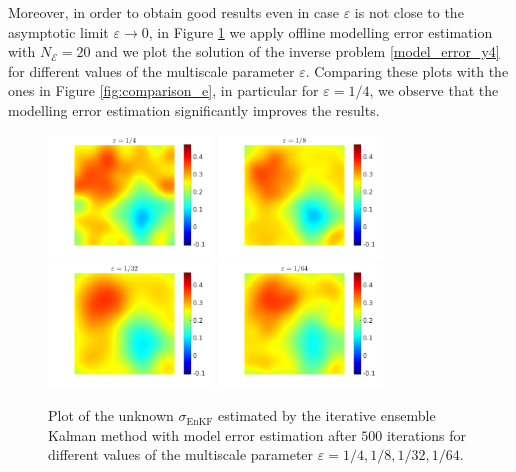 \documentclass[10pt]{article}
\begin{document}
Moreover, in order to obtain good results even in case $\varepsilon$ is not close to the asymptotic limit $\varepsilon \to 0$, in Figure \ref{fig:comparison_e_model_error} we apply offline modelling error estimation with $N_{\mathcal{E}} = 20$ and we plot the solution of the inverse problem \eqref{model_error_y4} for different values of the multiscale parameter $\varepsilon$. Comparing these plots with the ones in Figure \ref{fig:comparison_e}, in particular for $\varepsilon = 1/4$, we observe that the modelling error estimation significantly improves the results.

\begin{figure}[t]
\centering
\includegraphics[width = 0.39\textwidth]{ensemble_500_e4_model_error}
\includegraphics[width = 0.39\textwidth]{ensemble_500_e8_model_error}
\\
\includegraphics[width = 0.39\textwidth]{ensemble_500_e32_model_error}
\includegraphics[width = 0.39\textwidth]{ensemble_500_e64_model_error}
\caption{Plot of the unknown $\sigma_{\mathrm{EnKF}}$ estimated by the iterative ensemble Kalman method with model error estimation after $500$ iterations for different values of the multiscale parameter $\varepsilon = 1/4, 1/8, 1/32, 1/64$.}
\label{fig:comparison_e_model_error}
\end{figure}
\end{document}
